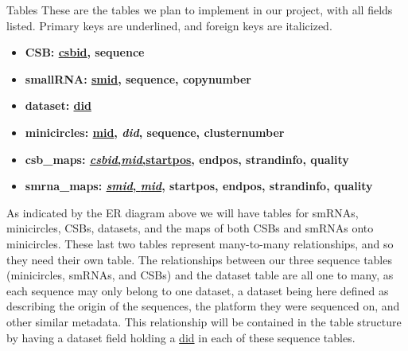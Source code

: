 \documentclass[a4paper,10pt,notitlepage]{article}
\begin{document}
\begin{section}{Tables}
    These are the tables we plan to implement in our project, with all fields listed. Primary keys are underlined,
    and foreign keys are italicized.

    \begin{itemize}
        \item \bfseries{CSB}: \underline{csbid}, sequence
        \item \bfseries{smallRNA}: \underline{smid}, sequence, copynumber
        \item \bfseries{dataset}: \underline{did}
        \item \bfseries{minicircles}: \underline{mid}, \textit{did}, sequence, clusternumber
        \item \bfseries{csb\_maps}: \underline{\textit{csbid},\textit{mid},startpos}, endpos, strandinfo, quality
        \item \bfseries{smrna\_maps}: \underline{\textit{smid}, \textit{mid}}, startpos, endpos, strandinfo, quality
    \end{itemize}
    
    As indicated by the ER diagram above we will have tables for smRNAs, minicircles, CSBs, datasets, and the maps of both 
    CSBs and smRNAs onto minicircles. These last two tables represent many-to-many relationships, and so they need their own 
    table. The relationships between our three sequence tables (minicircles, smRNAs, and CSBs) and the dataset table are all one to
    many, as each sequence may only belong to one dataset, a dataset being here defined as describing the origin of the sequences,
    the platform they were sequenced on, and other similar metadata. This relationship will be contained in the table structure 
    by having a dataset field holding a \underline{did} in each of these sequence tables. 


\end{section}
\end{document}

